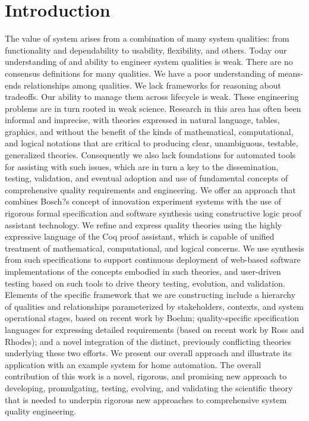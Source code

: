 \documentclass[conference]{IEEEtran}
\begin{document}
\section{Introduction}
The value of system arises from a combination of many system qualities: from functionality and dependability to usability, flexibility, and others. Today our understanding of and ability to engineer system qualities is weak. There are no consensus definitions for many qualities. We have a poor understanding of means-ends relationships among qualities. We lack frameworks for reasoning about tradeoffs. Our ability to manage them across lifecycle is weak. These engineering problems are in turn rooted in weak science. Research in this area has often been informal and imprecise, with theories expressed in natural language, tables, graphics, and without the benefit of the kinds of mathematical, computational, and logical notations that are critical to producing clear, unambiguous, testable, generalized theories. Consequently we also lack foundations for automated tools for assisting with such issues, which are in turn a key to the dissemination, testing, validation, and eventual adoption and use of fundamental concepts of comprehensive quality requirements and engineering. We offer an approach that combines Bosch?s concept of innovation experiment systems with the use of rigorous formal specification and software synthesis using constructive logic proof assistant technology. We refine and express quality theories using the highly expressive language of the Coq proof assistant, which is capable of unified treatment of mathematical, computational, and logical concerns. We use synthesis from such specifications to support continuous deployment of web-based software implementations of the concepts embodied in such theories, and  user-driven testing based on such tools to drive theory testing, evolution, and validation.  Elements of the specific framework that we are constructing include a hierarchy of qualities and relationships parameterized by stakeholders, contexts, and system operational stages, based on recent work by Boehm; quality-specific specification languages for expressing detailed requirements (based on recent work by Ross and Rhodes); and a novel integration of the distinct, previously conflicting theories underlying these two efforts. We present our overall approach and illustrate its application with an example system for home automation. The overall contribution of this work is a novel, rigorous, and promising new approach to developing, promulgating, testing, evolving, and validating the scientific theory that is needed to underpin rigorous new approaches to comprehensive system quality engineering.
\end{document}

